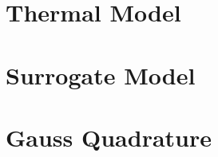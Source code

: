 \renewcommand{\thesection}{S\arabic{section}}
\renewcommand{\thetable}{S\arabic{table}}
\renewcommand{\thefigure}{S\arabic{figure}}
\setcounter{table}{0}
\setcounter{figure}{0}



\section{Thermal Model} 


\section{Surrogate Model} 


\section{Gauss Quadrature}
